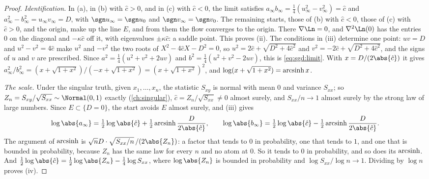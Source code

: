 \begin{refsection}
\begin{proof}
\emph{Identification.} In (a), in (b) with $\hat c>0$, and in (c) with $\hat c<0$, the limit satisfies $a_\infty b_\infty=\frac14(u_\infty^2-v_\infty^2)=\hat c$ and $a_\infty^2-b_\infty^2=u_\infty v_\infty=D$, with $\sgn u_\infty=\sgn u_0$ and $\sgn v_\infty=\sgn v_0$. The remaining starts, those of (b) with $\hat c<0$, those of (c) with $\hat c>0$, and the origin, make up the line $E$, and from them the flow converges to the origin. There $\nabla\Ln=0$, and $\nabla^2\Ln(0)$ has the entries $0$ on the diagonal and $-\kappa\hat c$ off it, with eigenvalues $\pm\kappa\hat c$: a saddle point. This proves (ii). The conditions in (iii) determine one point: $uv=D$ and $u^2-v^2=4\hat c$ make $u^2$ and $-v^2$ the two roots of $X^2-4\hat cX-D^2=0$, so $u^2=2\hat c+\sqrt{D^2+4\hat c^2}$ and $v^2=-2\hat c+\sqrt{D^2+4\hat c^2}$, and the signs of $u$ and $v$ are prescribed. Since $a^2=\frac14(u^2+v^2+2uv)$ and $b^2=\frac14(u^2+v^2-2uv)$, this is \eqref{eq:sgd:limit}. With $x=D/(2\abs{\hat c})$ it gives $a_\infty^2/b_\infty^2=(x+\sqrt{1+x^2})/(-x+\sqrt{1+x^2})=(x+\sqrt{1+x^2})^2$, and $\log(x+\sqrt{1+x^2})=\operatorname{arcsinh} x$.

\emph{The scale.} Under the singular truth, given $x_1,\dots,x_n$, the statistic $S_{xy}$ is normal with mean $0$ and variance $S_{xx}$; so $Z_n=S_{xy}/\sqrt{S_{xx}}\sim\Normal(0,1)$ exactly (\cref{ch:singular}), $\hat c=Z_n/\sqrt{S_{xx}}\ne0$ almost surely, and $S_{xx}/n\to1$ almost surely by the strong law of large numbers. Since $E\subset\{D=0\}$, the start avoids $E$ almost surely, and (iii) gives
\[
\log\abs{a_\infty}=\tfrac12\log\abs{\hat c}+\tfrac12\sgdasinh\frac D{2\abs{\hat c}},\qquad\log\abs{b_\infty}=\tfrac12\log\abs{\hat c}-\tfrac12\sgdasinh\frac D{2\abs{\hat c}}.
\]
The argument of $\operatorname{arcsinh}$ is $\sqrt nD\cdot\sqrt{S_{xx}/n}\,/(2\abs{Z_n})$: a factor that tends to $0$ in probability, one that tends to $1$, and one that is bounded in probability, because $Z_n$ has the same law for every $n$ and no atom at $0$. So it tends to $0$ in probability, and so does its $\operatorname{arcsinh}$. And $\frac12\log\abs{\hat c}=\frac12\log\abs{Z_n}-\frac14\log S_{xx}$, where $\log\abs{Z_n}$ is bounded in probability and $\log S_{xx}/\log n\to1$. Dividing by $\log n$ proves (iv).
\end{proof}


\end{refsection}
